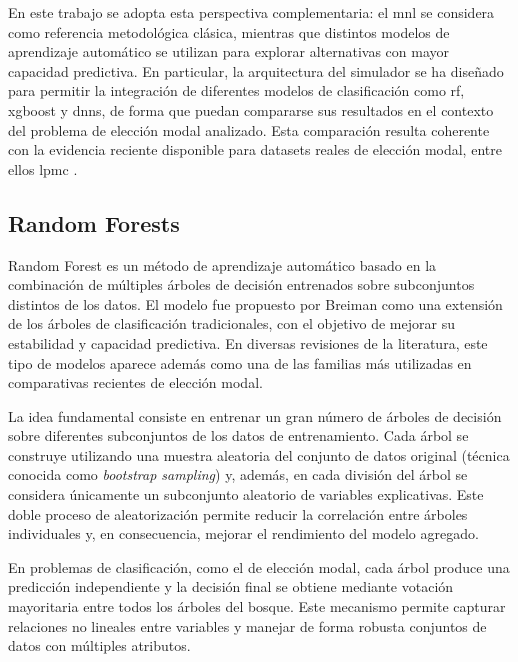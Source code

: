 En este trabajo se adopta esta perspectiva complementaria: el \acrlong{mnl} se considera como referencia metodológica clásica, mientras que distintos modelos de aprendizaje automático se utilizan para explorar alternativas con mayor capacidad predictiva. En particular, la arquitectura del simulador se ha diseñado para permitir la integración de diferentes modelos de clasificación como \gls{rf}, \acrshort{xgboost} y \glspl{dnn}, de forma que puedan compararse sus resultados en el contexto del problema de elección modal analizado. Esta comparación resulta coherente con la evidencia reciente disponible para datasets reales de elección modal, entre ellos \gls{lpmc} \cite{Hillel2018LPMC}.\newline

\subsection{Random Forests}

Random Forest es un método de aprendizaje automático basado en la combinación de múltiples árboles de decisión entrenados sobre subconjuntos distintos de los datos. El modelo fue propuesto por Breiman \cite{Breiman2001} como una extensión de los árboles de clasificación tradicionales, con el objetivo de mejorar su estabilidad y capacidad predictiva. En diversas revisiones de la literatura, este tipo de modelos aparece además como una de las familias más utilizadas en comparativas recientes de elección modal.
\newpage

La idea fundamental consiste en entrenar un gran número de árboles de decisión sobre diferentes subconjuntos de los datos de entrenamiento. Cada árbol se construye utilizando una muestra aleatoria del conjunto de datos original (técnica conocida como \textit{bootstrap sampling}) y, además, en cada división del árbol se considera únicamente un subconjunto aleatorio de variables explicativas. Este doble proceso de aleatorización permite reducir la correlación entre árboles individuales y, en consecuencia, mejorar el rendimiento del modelo agregado.\newline

En problemas de clasificación, como el de elección modal, cada árbol produce una predicción independiente y la decisión final se obtiene mediante votación mayoritaria entre todos los árboles del bosque. Este mecanismo permite capturar relaciones no lineales entre variables y manejar de forma robusta conjuntos de datos con múltiples atributos.\newline

